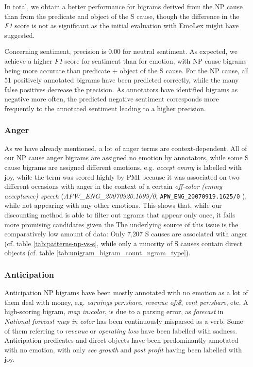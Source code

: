 In total, we obtain a better performance for bigrams derived from the NP cause than from the predicate and object of the S cause, though the difference in the \textit{F1} score is not as significant as the initial evaluation with EmoLex might have suggested.

Concerning sentiment, precision is 0.00 for neutral sentiment. As expected, we achieve a higher \textit{F1} score for sentiment than for emotion, with NP cause bigrams being more accurate than predicate + object of the S cause. For the NP cause, all 51 positively annotated bigrams have been predicted correctly, while the many false positives decrease the precision. As annotators have identified bigrams as negative more often, the predicted negative sentiment corresponds more frequently to the annotated sentiment leading to a higher precision.

\subsubsection{Anger}

As we have already mentioned, a lot of anger terms are context-dependent. All of our NP cause anger bigrams are assigned no emotion by annotators, while some S cause bigrams are assigned different emotions, e.g. \textit{accept emmy} is labelled with joy, while the term was scored highly by PMI because it was associated on two different occasions with anger in the context of a certain \textit{off-color (emmy acceptance) speech} (\textit{APW\_ENG\_20070920.1099/0}, \texttt{APW\_ENG\_20070919.1625/0} ), while not appearing with any other emotions. This shows that, while our discounting method is able to filter out ngrams that appear only once, it fails more promising candidates given the  The underlying source of this issue is the comparatively low amount of data: Only 7,207 S causes are associated with anger (cf. table \ref{tab:patterns-np-vs-s}, while only a minority of S causes contain direct objects (cf. table \ref{tab:unigram_bigram_count_ngram_type}).

\subsubsection{Anticipation}

Anticipation NP bigrams have been mostly annotated with no emotion as a lot of them deal with money, e.g. \textit{earnings per:share}, \textit{revenue of:\$}, \textit{cent per:share}, etc. A high-scoring bigram, \textit{map in:color}, is due to a parsing error, as \textit{forecast} in \textit{National forecast map in color} has been continuously misparsed as a verb. Some of them referring to \textit{revenue} or \textit{operating loss} have been labelled with sadness. Anticipation predicates and direct objects have been predominantly annotated with no emotion, with only \textit{see growth} and \textit{post profit} having been labelled with joy.

